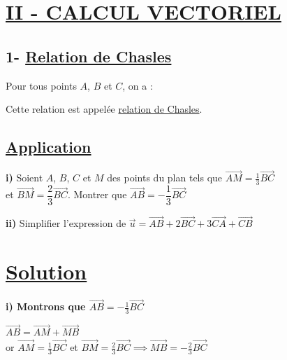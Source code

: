 \documentclass{article}
\begin{document}
\section*{\underline{\uppercase{\uppercase{II - Calcul vectoriel}}}}

\subsection*{1- \underline{\color{red}Relation de Chasles}}

\noindent Pour tous points $A$, $B$ et $C$, on a :
\begin{center}
    \color{red}
\end{center}
\noindent Cette relation est appelée \underline{relation de Chasles}.

\vspace{1.5em}

\subsection*{\underline{\color{red}Application}}

\noindent \textbf{i)} Soient $A$, $B$, $C$ et $M$ des points du plan tels que $\overrightarrow{AM} = \frac{1}{3} \overrightarrow{BC}$ \\
et $\overrightarrow{BM} = \dfrac{2}{3} \overrightarrow{BC}$. Montrer que $\overrightarrow{AB} = -\dfrac{1}{3} \overrightarrow{BC}$

\vspace{1em}

\noindent \textbf{ii)} Simplifier l'expression de $\vec{u} = \overrightarrow{AB} + 2\overrightarrow{BC} + 3\overrightarrow{CA} + \overrightarrow{CB}$

\section*{\underline{\color{red}Solution}}

\noindent \textbf{i) Montrons que $\overrightarrow{AB} = -\frac{1}{3} \overrightarrow{BC}$}

\vspace{1em}

\noindent $\overrightarrow{AB} = \overrightarrow{AM} + \overrightarrow{MB}$ \\
or $\overrightarrow{AM} = \frac{1}{3} \overrightarrow{BC}$ \quad et \quad $\overrightarrow{BM} = \frac{2}{3} \overrightarrow{BC} \implies \overrightarrow{MB} = -\frac{2}{3} \overrightarrow{BC}$
\end{document}
